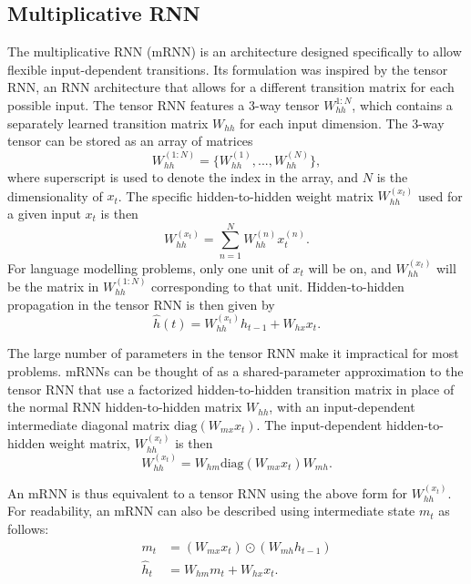 \documentclass{article}
\begin{document}
\subsection{Multiplicative RNN}
The multiplicative RNN (mRNN) \citep{Sutskever-2011} is an architecture designed specifically to allow flexible input-dependent transitions. Its formulation was inspired by the tensor RNN, an RNN architecture that allows for a different transition matrix for each possible input. The tensor RNN features a 3-way tensor $W_{hh}^{1:N}$, which contains a separately learned transition matrix $W_{hh}$ for each input dimension. The 3-way tensor can be stored as an array of matrices 
\begin{equation}
W_{hh}^{(1:N)} = \{ W_{hh}^{(1)},...,W_{hh}^{(N)} \},
\end{equation}
where superscript is used to denote the index in the array, and $N$ is the dimensionality of $x_t$. The specific hidden-to-hidden weight matrix  $W_{hh}^{(x_t)}$ used for a given input $x_t$ is then
\begin{equation}
 W_{hh}^{(x_t)} = \sum_{n=1}^{N} W_{hh}^{(n)} x_t^{(n)}.
\end{equation}
For language modelling problems, only one unit of $x_t$ will be on, and  $W_{hh}^{(x_t)}$ will be the matrix in $W_{hh}^{(1:N)}$ corresponding to that unit. Hidden-to-hidden propagation in the tensor RNN is then given by
\begin{equation}
\hat{h}(t) =  W_{hh}^{(x_t)} h_{t-1} + W_{hx}x_{t}.
\end{equation}

The large number of parameters in the tensor RNN make it impractical for most problems. mRNNs can be thought of as a shared-parameter approximation to the tensor RNN that use a factorized hidden-to-hidden transition matrix in place of the normal RNN hidden-to-hidden matrix $W_{hh}$, with an input-dependent intermediate diagonal matrix $\mathrm{diag}(W_{mx}x_t)$. The input-dependent hidden-to-hidden weight matrix, $W_{hh}^{(x_t)}$ is then
\begin{equation}
W_{hh}^{(x_t)} = W_{hm} \mathrm{diag}(W_{mx}x_t) W_{mh}.
\end{equation}


An mRNN is thus equivalent to a tensor RNN using the above form for $W_{hh}^{(x_t)}$. For readability, an mRNN can also be described using intermediate state $m_t$ as follows:
\begin{align}
m_t &= (W_{mx} x_t) \odot (W_{mh}h_{t-1}) \\
\hat{h}_t &= W_{hm}m_t + W_{hx}x_{t}.
\end{align}
\end{document}
